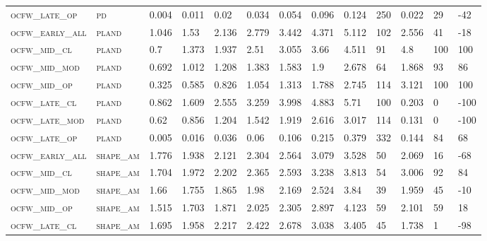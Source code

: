 \begin{landscape}
\begin{center}
\begin{footnotesize}
\begin{longtable}{lllllllllllll}
\textsc{ocfw\_late\_op  } & \textsc{pd        }   & 0.004    & 0.011    & 0.02     & 0.034    & 0.054    & 0.096    & 0.124    & 250 & 0.022    & 29  & -42  \\
\textsc{ocfw\_early\_all} & \textsc{pland     }   & 1.046    & 1.53     & 2.136    & 2.779    & 3.442    & 4.371    & 5.112    & 102 & 2.556    & 41  & -18  \\
\textsc{ocfw\_mid\_cl   } & \textsc{pland     }   & 0.7      & 1.373    & 1.937    & 2.51     & 3.055    & 3.66     & 4.511    & 91  & 4.8      & 100 & 100  \\
\textsc{ocfw\_mid\_mod  } & \textsc{pland     }   & 0.692    & 1.012    & 1.208    & 1.383    & 1.583    & 1.9      & 2.678    & 64  & 1.868    & 93  & 86   \\
\textsc{ocfw\_mid\_op   } & \textsc{pland     }   & 0.325    & 0.585    & 0.826    & 1.054    & 1.313    & 1.788    & 2.745    & 114 & 3.121    & 100 & 100  \\
\textsc{ocfw\_late\_cl  } & \textsc{pland     }   & 0.862    & 1.609    & 2.555    & 3.259    & 3.998    & 4.883    & 5.71     & 100 & 0.203    & 0   & -100 \\
\textsc{ocfw\_late\_mod } & \textsc{pland     }   & 0.62     & 0.856    & 1.204    & 1.542    & 1.919    & 2.616    & 3.017    & 114 & 0.131    & 0   & -100 \\
\textsc{ocfw\_late\_op  } & \textsc{pland     }   & 0.005    & 0.016    & 0.036    & 0.06     & 0.106    & 0.215    & 0.379    & 332 & 0.144    & 84  & 68   \\
\textsc{ocfw\_early\_all} & \textsc{shape\_am }   & 1.776    & 1.938    & 2.121    & 2.304    & 2.564    & 3.079    & 3.528    & 50  & 2.069    & 16  & -68  \\
\textsc{ocfw\_mid\_cl   } & \textsc{shape\_am }   & 1.704    & 1.972    & 2.202    & 2.365    & 2.593    & 3.238    & 3.813    & 54  & 3.006    & 92  & 84   \\
\textsc{ocfw\_mid\_mod  } & \textsc{shape\_am }   & 1.66     & 1.755    & 1.865    & 1.98     & 2.169    & 2.524    & 3.84     & 39  & 1.959    & 45  & -10  \\
\textsc{ocfw\_mid\_op   } & \textsc{shape\_am }   & 1.515    & 1.703    & 1.871    & 2.025    & 2.305    & 2.897    & 4.123    & 59  & 2.101    & 59  & 18   \\
\textsc{ocfw\_late\_cl  } & \textsc{shape\_am }   & 1.695    & 1.958    & 2.217    & 2.422    & 2.678    & 3.038    & 3.405    & 45  & 1.738    & 1   & -98  \\

\end{longtable}
\end{footnotesize}
\end{center}
\end{landscape}
